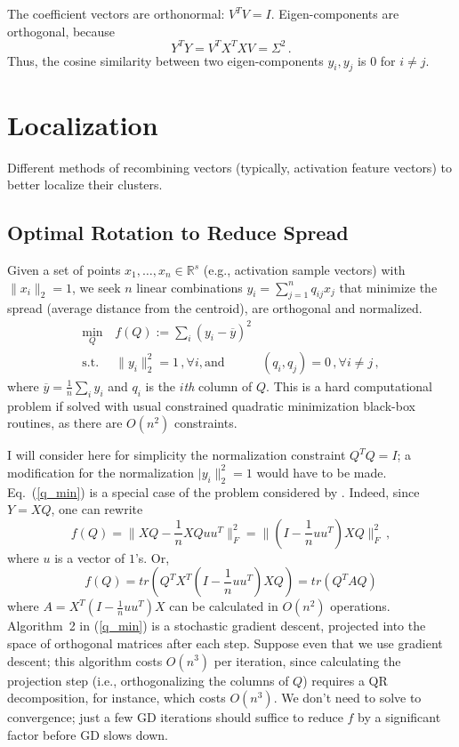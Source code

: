 \documentclass[11pt]{article}
\newcommand{\Real}{\mathbb{R}}
\begin{document}
The coefficient vectors are orthonormal: $V^T V = I$. Eigen-components are orthogonal, because 
\begin{equation}
    Y^T Y = V^T X^T X V = \Sigma^2\,.
\end{equation}
Thus, the cosine similarity between two eigen-components $y_i, y_j$ is $0$ for $i \not = j$.

\section{Localization}
\label{sec:localization}
Different methods of recombining vectors (typically, activation feature vectors) to better localize their clusters.

\subsection{Optimal Rotation to Reduce Spread}
\label{sec:opt_spread}
Given a set of points $x_1,\dots,x_n \in \Real^s$ (e.g., activation sample vectors) with $\|x_i\|_2 = 1$, we seek $n$ linear combinations $y_i = \sum_{j=1}^n q_{ij} x_j$ that minimize the spread (average distance from the centroid), are orthogonal and normalized.
\begin{equation}
    \begin{aligned}
       \min_Q\, & f(Q) := \sum_i \left( y_i - \overline{y}\right)^2 \\
        \text{s.t.}\, & \|y_i\|^2_2 = 1\,, \forall i,
        \text{and}\, & (q_i, q_j) = 0\,, \forall i \not = j\,,
    \end{aligned}
    \label{q_min}
\end{equation}
where $\overline{y} = \frac{1}{n} \sum_i y_i$ and $q_i$ is the $i${\it th} column of $Q$. This is a hard computational problem if solved with usual constrained quadratic minimization black-box routines, as there are $O(n^2)$ constraints.

I will consider here for simplicity the normalization constraint $Q^T Q = I$; a modification for the normalization $|y_i\|^2_2 = 1$ would have to be made. Eq.~(\ref{q_min}) is a special case of the problem considered by \cite{qpqc_sgd}. Indeed, since $Y = X Q$, one can rewrite
$$ f(Q) = \|X Q - \frac{1}{n} X Q u u^T \|_F^2 =
\|(I - \frac{1}{n} u u^T) X Q\|_F^2 \,, $$
where $u$ is a vector of $1$'s. Or,
$$ f(Q) = tr(Q^T X^T (I - \frac{1}{n} u u^T) X Q) = tr(Q^T A Q) $$
where $A = X^T (I - \frac{1}{n} u u^T) X$ can be calculated in $O(n^2)$ operations. Algorithm~2 in (\ref{q_min}) is a stochastic gradient descent, projected into the space of orthogonal matrices after each step. Suppose even that we use gradient descent; this algorithm costs $O(n^3)$ per iteration, since calculating the projection step (i.e., orthogonalizing the columns of $Q$) requires a QR decomposition, for instance, which costs $O(n^3)$. We don't need to solve to convergence; just a few GD iterations should suffice to reduce $f$ by a significant factor before GD slows down.
\end{document}
